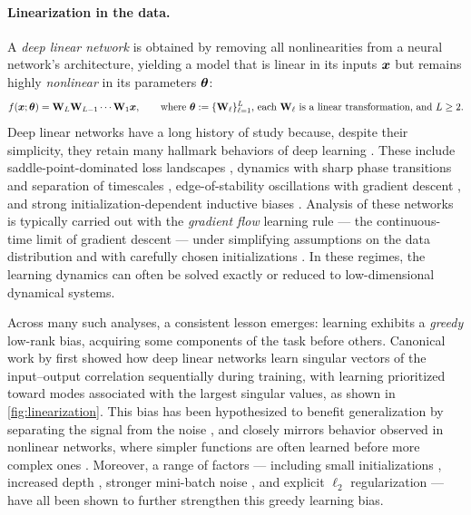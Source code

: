 \paragraph{Linearization in the data.}
A \emph{deep linear network} is obtained by removing all nonlinearities from a neural network's architecture, yielding a model that is linear in its inputs ${\bm{x}}$ but remains highly \emph{nonlinear} in its parameters ${\bm{\theta}}$:
\begin{equation}
    f({\bm{x}};{\bm{\theta}}) = \mathbf{W}_L \mathbf{W}_{L-1} \cdots \mathbf{W}_1 {\bm{x}},
    \qquad
    \text{where }  {\bm{\theta}} := \{\mathbf{W}_\ell\}_{\ell = 1}^L\text{, each }\mathbf{W}_\ell \text{ is a linear transformation, and } L \ge 2.
\end{equation}
Deep linear networks have a long history of study because, despite their simplicity, they retain many hallmark behaviors of deep learning \citep{nam2025position}. These include saddle-point-dominated loss landscapes \citep{baldi1989neural}, dynamics with sharp phase transitions and separation of timescales \citep{gissin2019implicit,atanasov2021neural}, edge-of-stability oscillations with gradient descent \citep{even2023s}, and strong initialization-dependent inductive biases \citep{woodworth2020kernel, kunin2024get}.
Analysis of these networks is typically carried out with the \emph{gradient flow} learning rule --- the continuous-time limit of gradient descent --- under simplifying assumptions on the data distribution and with carefully chosen initializations \citep{fukumizu1998effect,saxe2014exact,tarmoun2021understanding,domine2025lazy}.
In these regimes, the learning dynamics can often be solved exactly or reduced to low-dimensional dynamical systems.


Across many such analyses, a consistent lesson emerges: learning exhibits a \emph{greedy} low-rank bias, acquiring some components of the task before others.
Canonical work by \citet{saxe2014exact} first showed how deep linear networks learn singular vectors of the input–output correlation sequentially during training, with learning prioritized toward modes associated with the largest singular values, as shown in \cref{fig:linearization}.
This bias has been hypothesized to benefit generalization by separating the signal from the noise \citep{lampinen2018analytic}, and closely mirrors behavior observed in nonlinear networks, where simpler functions are often learned before more complex ones \citep{kalimeris2019sgd, simon2023stepwise}.
Moreover, a range of factors --- including small initializations \citep{gidel2019implicit,li2021towards,jacot2021saddle,pesme2023saddle}, increased depth \citep{gunasekar2018implicit, arora2018optimization, arora2019implicit}, stronger mini-batch noise \citep{pesme2021implicit,chen2024stochastic}, and explicit $\ell_2$ regularization \citep{ziyin2022exact,wang2024implicit} --- have all been shown to further strengthen this greedy learning bias.


